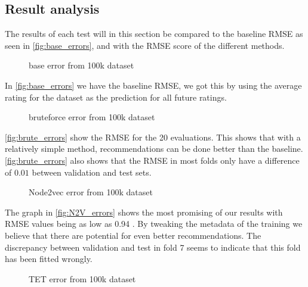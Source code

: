 \subsection{Result analysis}\label{Subsec:results}
The results of each test will in this section be compared to the baseline RMSE as seen in \autoref{fig:base_errors}, and with the RMSE score of the different methods.


\begin{figure}[H]
	\centering
	\begin{adjustbox}{width=0.5\textwidth}
		
	\end{adjustbox}
	\caption{base error from 100k dataset }
	\label{fig:base_errors}
\end{figure}

In \autoref{fig:base_errors} we have the baseline RMSE, we got this by using the average rating for the dataset as the prediction for all future ratings.

\begin{figure}[H]
	\centering
	\begin{adjustbox}{width=0.5\textwidth}
		
	\end{adjustbox}
	\caption{bruteforce error from 100k dataset }
	\label{fig:brute_errors}
\end{figure}

\autoref{fig:brute_errors} show the RMSE for the 20 evaluations. 
This shows that with a relatively simple method, recommendations can be done better than the baseline.
\autoref{fig:brute_errors} also shows that the RMSE in most folds only have a difference of $0.01$ between validation and test sets.

\begin{figure}[H]
	\centering
	\begin{adjustbox}{width=0.5\textwidth}
		
	\end{adjustbox}
	\caption{Node2vec error from 100k dataset}
	\label{fig:N2V_errors}
\end{figure}

The graph in \autoref{fig:N2V_errors} shows the most promising of our results with RMSE values being as low as 0.94 . By tweaking the metadata of the training we believe that there are potential for even better recommendations.
The discrepancy between validation and test in fold 7 seems to indicate that this fold has been fitted wrongly.


\begin{figure}[H]
	\centering
	\begin{adjustbox}{width=0.5\textwidth}
		
	\end{adjustbox}
	\caption{TET error from 100k dataset }
	\label{fig:tet_errors}
\end{figure}


